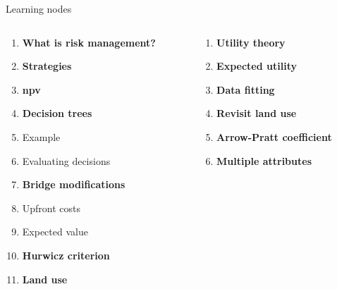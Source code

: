 \documentclass[aspectratio=1610,pdftex,dvipsnames,compress,xcolor={dvipsnames}]{beamer}
\newcommand{\acf}{\acrfull} %
\begin{document}
\begin{frame}{Learning nodes}
    \begin{columns}[t]

        \begin{column}{0.50\textwidth}
            \begin{enumerate}[series=outerlist,topsep=0pt,itemsep=1pt,leftmargin=*,label=(\arabic*)]
                \item[]\textbf{What is risk management?}
                    \vspace{0.10in}
                \item[]\textbf{Strategies}
                    \vspace{0.10in}
                \item[]\textbf{\acf{npv}}
                    \vspace{0.10in}
                \item[]\textbf{Decision trees}
                \item[]Example
                \item[]Evaluating decisions  
                    \vspace{0.10in}
                \item[]\textbf{Bridge modifications}
                \item[]Upfront costs  
                \item[]Expected value  
                    \vspace{0.10in}
                \item[]\textbf{Hurwicz criterion}
                    \vspace{0.10in}
                \item[]\textbf{Land use}
            \end{enumerate}
        \end{column}

        \begin{column}{0.50\textwidth}
            \begin{enumerate}[series=outerlist,topsep=0pt,itemsep=1pt,leftmargin=*,label=(\arabic*)]
                \item[]\hfill\textbf{Utility theory}
                    \vspace{0.15in}
                \item[]\hfill\textbf{Expected utility}
                    \vspace{0.15in}
                \item[]\hfill\textbf{Data fitting}
                    \vspace{0.15in}
                \item[]\hfill\textbf{Revisit land use}
                    \vspace{0.15in}
                \item[]\hfill\textbf{Arrow-Pratt coefficient}
                    \vspace{0.15in}
                \item[]\hfill\textbf{Multiple attributes}
            \end{enumerate}
        \end{column}


\end{columns}
\end{frame}
\end{document}
